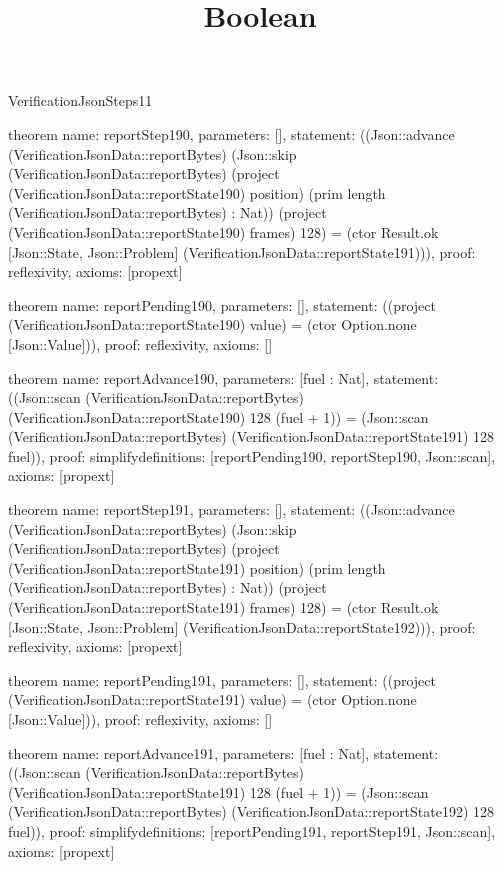 \begin{lexlean}{VerificationJsonSteps11}
\title{Boolean}
\begin{semanticmodule}

theorem{
  name: reportStep190,
  parameters: [],
  statement: ((Json::advance (VerificationJsonData::reportBytes) (Json::skip (VerificationJsonData::reportBytes) (project (VerificationJsonData::reportState190) position) (prim length (VerificationJsonData::reportBytes) : Nat)) (project (VerificationJsonData::reportState190) frames) 128) = (ctor Result.ok [Json::State, Json::Problem] (VerificationJsonData::reportState191))),
  proof: reflexivity{},
  axioms: [propext]
}

theorem{
  name: reportPending190,
  parameters: [],
  statement: ((project (VerificationJsonData::reportState190) value) = (ctor Option.none [Json::Value])),
  proof: reflexivity{},
  axioms: []
}

theorem{
  name: reportAdvance190,
  parameters: [fuel : Nat],
  statement: ((Json::scan (VerificationJsonData::reportBytes) (VerificationJsonData::reportState190) 128 (fuel + 1)) = (Json::scan (VerificationJsonData::reportBytes) (VerificationJsonData::reportState191) 128 fuel)),
  proof: simplify{definitions: [reportPending190, reportStep190, Json::scan]},
  axioms: [propext]
}

theorem{
  name: reportStep191,
  parameters: [],
  statement: ((Json::advance (VerificationJsonData::reportBytes) (Json::skip (VerificationJsonData::reportBytes) (project (VerificationJsonData::reportState191) position) (prim length (VerificationJsonData::reportBytes) : Nat)) (project (VerificationJsonData::reportState191) frames) 128) = (ctor Result.ok [Json::State, Json::Problem] (VerificationJsonData::reportState192))),
  proof: reflexivity{},
  axioms: [propext]
}

theorem{
  name: reportPending191,
  parameters: [],
  statement: ((project (VerificationJsonData::reportState191) value) = (ctor Option.none [Json::Value])),
  proof: reflexivity{},
  axioms: []
}

theorem{
  name: reportAdvance191,
  parameters: [fuel : Nat],
  statement: ((Json::scan (VerificationJsonData::reportBytes) (VerificationJsonData::reportState191) 128 (fuel + 1)) = (Json::scan (VerificationJsonData::reportBytes) (VerificationJsonData::reportState192) 128 fuel)),
  proof: simplify{definitions: [reportPending191, reportStep191, Json::scan]},
  axioms: [propext]
}


\end{semanticmodule}
\end{lexlean}
